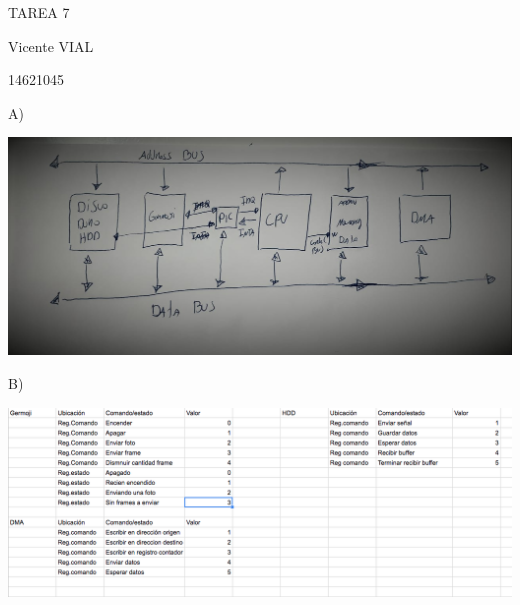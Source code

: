 \documentclass{article}
\begin{document}
\lstset{language=Assemblyx86}


            TAREA 7


Vicente VIAL 

14621045


A)




\includegraphics[width=20cm]{foto.jpeg}
 



B)

\includegraphics[width=18cm]{foto1.png}
\end{document}

